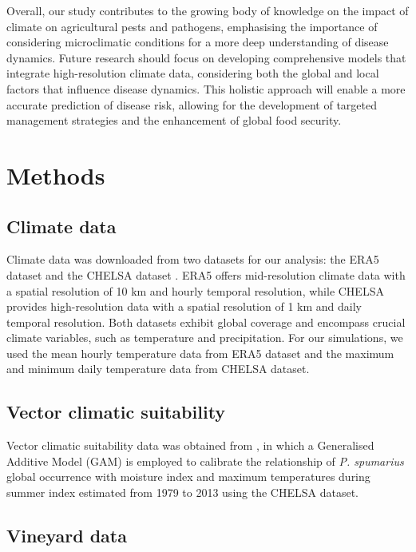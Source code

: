 Overall, our study contributes to the growing body of knowledge on the
impact of climate on agricultural pests and pathogens, emphasising the
importance of considering microclimatic conditions for a more deep
understanding of disease dynamics. Future research should focus on developing
comprehensive models that integrate high-resolution climate data, considering
both the global and local factors that influence disease dynamics. This
holistic approach will enable a more accurate prediction of disease risk,
allowing for the development of targeted management strategies and the
enhancement of global food security.

\section{Methods}

\subsection{Climate data}

Climate data was downloaded from two datasets for our analysis: the ERA5
dataset \cite{munoz-sabater_era5-land_2021, munoz2019era5land} and the CHELSA
dataset \cite{Karger2017, chelsa-climatologies-2021}. ERA5 offers
mid-resolution climate data with a spatial resolution of 10 km and hourly
temporal resolution, while CHELSA provides high-resolution data with a spatial
resolution of 1 km and daily temporal resolution. Both datasets exhibit global
coverage and encompass crucial climate variables, such as temperature and
precipitation. For our simulations, we used the mean hourly temperature data
from ERA5 dataset and the maximum and minimum daily temperature data from
CHELSA dataset.

\subsection{Vector climatic suitability}

Vector climatic suitability data was obtained from \cite{Godefroid2022}, in
which a Generalised Additive Model (GAM) is employed to calibrate the
relationship of \textit{P. spumarius} global occurrence with moisture index and
maximum temperatures during summer index estimated from 1979 to 2013 using the
CHELSA dataset.

\subsection{Vineyard data}


